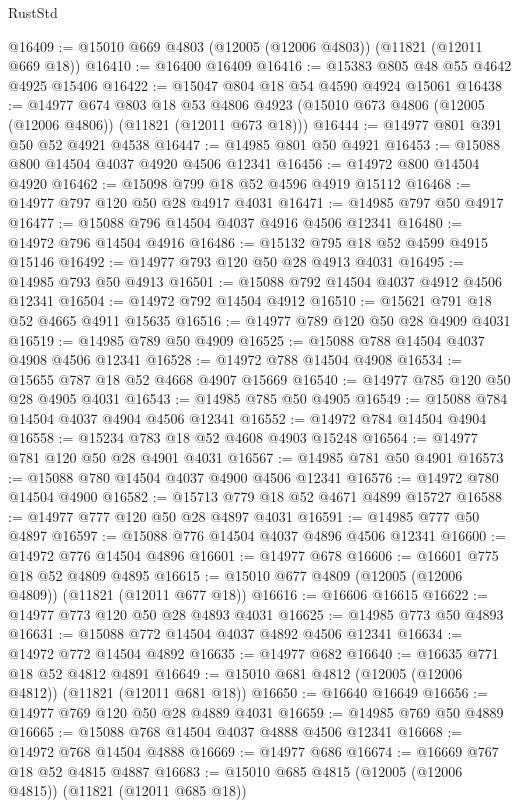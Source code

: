 \begin{lexlean}{RustStd}
\begin{coremodule}
@16409 := @15010 @669 @4803 (@12005 (@12006 @4803)) (@11821 (@12011 @669 @18))
@16410 := @16400 @16409
@16416 := @15383 @805 @48 @55 @4642 @4925 @15406
@16422 := @15047 @804 @18 @54 @4590 @4924 @15061
@16438 := @14977
    @674
    @803
    @18
    @53
    @4806
    @4923
    (@15010 @673 @4806 (@12005 (@12006 @4806)) (@11821 (@12011 @673 @18)))
@16444 := @14977 @801 @391 @50 @52 @4921 @4538
@16447 := @14985 @801 @50 @4921
@16453 := @15088 @800 @14504 @4037 @4920 @4506 @12341
@16456 := @14972 @800 @14504 @4920
@16462 := @15098 @799 @18 @52 @4596 @4919 @15112
@16468 := @14977 @797 @120 @50 @28 @4917 @4031
@16471 := @14985 @797 @50 @4917
@16477 := @15088 @796 @14504 @4037 @4916 @4506 @12341
@16480 := @14972 @796 @14504 @4916
@16486 := @15132 @795 @18 @52 @4599 @4915 @15146
@16492 := @14977 @793 @120 @50 @28 @4913 @4031
@16495 := @14985 @793 @50 @4913
@16501 := @15088 @792 @14504 @4037 @4912 @4506 @12341
@16504 := @14972 @792 @14504 @4912
@16510 := @15621 @791 @18 @52 @4665 @4911 @15635
@16516 := @14977 @789 @120 @50 @28 @4909 @4031
@16519 := @14985 @789 @50 @4909
@16525 := @15088 @788 @14504 @4037 @4908 @4506 @12341
@16528 := @14972 @788 @14504 @4908
@16534 := @15655 @787 @18 @52 @4668 @4907 @15669
@16540 := @14977 @785 @120 @50 @28 @4905 @4031
@16543 := @14985 @785 @50 @4905
@16549 := @15088 @784 @14504 @4037 @4904 @4506 @12341
@16552 := @14972 @784 @14504 @4904
@16558 := @15234 @783 @18 @52 @4608 @4903 @15248
@16564 := @14977 @781 @120 @50 @28 @4901 @4031
@16567 := @14985 @781 @50 @4901
@16573 := @15088 @780 @14504 @4037 @4900 @4506 @12341
@16576 := @14972 @780 @14504 @4900
@16582 := @15713 @779 @18 @52 @4671 @4899 @15727
@16588 := @14977 @777 @120 @50 @28 @4897 @4031
@16591 := @14985 @777 @50 @4897
@16597 := @15088 @776 @14504 @4037 @4896 @4506 @12341
@16600 := @14972 @776 @14504 @4896
@16601 := @14977 @678
@16606 := @16601 @775 @18 @52 @4809 @4895
@16615 := @15010 @677 @4809 (@12005 (@12006 @4809)) (@11821 (@12011 @677 @18))
@16616 := @16606 @16615
@16622 := @14977 @773 @120 @50 @28 @4893 @4031
@16625 := @14985 @773 @50 @4893
@16631 := @15088 @772 @14504 @4037 @4892 @4506 @12341
@16634 := @14972 @772 @14504 @4892
@16635 := @14977 @682
@16640 := @16635 @771 @18 @52 @4812 @4891
@16649 := @15010 @681 @4812 (@12005 (@12006 @4812)) (@11821 (@12011 @681 @18))
@16650 := @16640 @16649
@16656 := @14977 @769 @120 @50 @28 @4889 @4031
@16659 := @14985 @769 @50 @4889
@16665 := @15088 @768 @14504 @4037 @4888 @4506 @12341
@16668 := @14972 @768 @14504 @4888
@16669 := @14977 @686
@16674 := @16669 @767 @18 @52 @4815 @4887
@16683 := @15010 @685 @4815 (@12005 (@12006 @4815)) (@11821 (@12011 @685 @18))

\end{coremodule}
\end{lexlean}
